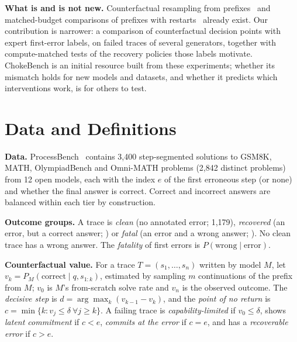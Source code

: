 \documentclass[10pt,twocolumn]{article}
\begin{document}
\textbf{What is and is not new.} Counterfactual resampling from prefixes~\cite{bogdan2025,macar2025branches,merrill2026}
and matched-budget comparisons of prefixes with restarts~\cite{bulut2026} already exist. Our
contribution is narrower: a comparison of counterfactual decision points with expert first-error
labels, on failed traces of several generators, together with compute-matched tests of the recovery
policies those labels motivate. ChokeBench is an initial resource built from these experiments;
whether its mismatch holds for new models and datasets, and whether it predicts which interventions
work, is for others to test.

\section{Data and Definitions}
\textbf{Data.} ProcessBench~\cite{processbench} contains 3,400 step-segmented solutions to GSM8K,
MATH, OlympiadBench and Omni-MATH problems (2,842 distinct problems) from 12 open models, each with
the index $e$ of the first erroneous step (or none) and whether the final answer is correct. Correct
and incorrect answers are balanced within each tier by construction.

\textbf{Outcome groups.} A trace is \emph{clean} (no annotated error; 1,179), \emph{recovered}
(an error, but a correct answer; \nRecovered) or \emph{fatal} (an error and a wrong answer; \nFatal).
No clean trace has a wrong answer. The \emph{fatality} of first errors is
$P(\text{wrong} \mid \text{error})$.

\textbf{Counterfactual value.} For a trace $T=(s_1,\dots,s_n)$ written by model $M$, let
$v_k = P_M(\text{correct} \mid q, s_{1:k})$, estimated by sampling $m$ continuations of the prefix
from $M$; $v_0$ is $M$'s from-scratch solve rate and $v_n$ is the observed outcome. The
\emph{decisive step} is $d=\arg\max_k (v_{k-1}-v_k)$, and the \emph{point of no return} is
$c=\min\{k : v_j\le\delta\ \forall j\ge k\}$. A failing trace is \emph{capability-limited} if
$v_0\le\delta$, shows \emph{latent commitment} if $c<e$, \emph{commits at the error} if $c=e$, and
has a \emph{recoverable error} if $c>e$.
\end{document}
